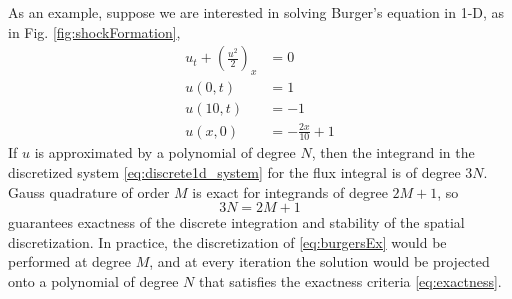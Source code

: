 \documentclass[12pt]{softwaremanual}
\begin{document}
As an example, suppose we are interested in solving Burger's equation in 1-D, as in Fig. \ref{fig:shockFormation}, 
\begin{subequations}
\begin{align}
 u_t + \left(\frac{u^2}{2}\right)_x &= 0 \\
 u(0,t) &= 1 \\
 u(10,t) &= -1 \\
 u(x,0) &= -\frac{2x}{10} + 1
\end{align}
\end{subequations}\label{eq:burgersEx}
If $u$ is approximated by a polynomial of degree $N$, then the integrand in the discretized system \eqref{eq:discrete1d_system} for the flux integral is of degree $3N$. Gauss quadrature of order $M$ is exact for integrands of degree $2M+1$, so 
\begin{equation}
3N = 2M+1 \label{eq:exactness}
\end{equation}
guarantees exactness of the discrete integration and stability of the spatial discretization. In practice, the discretization of \eqref{eq:burgersEx} would be performed at degree $M$, and at every iteration the solution would be projected onto a polynomial of degree $N$ that satisfies the exactness criteria \eqref{eq:exactness}.
\end{document}
